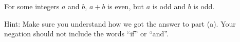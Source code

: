 \subsubsection*{ \answers}
\begin{apart}
    \item For some integers $a$ and $b$, $a+b$ is even, but $a$ is odd and $b$ is odd.
    \item Hint: Make sure you understand how we got the answer to part (a).  Your negation should not include the words ``if'' or ``and''.
\end{apart}




